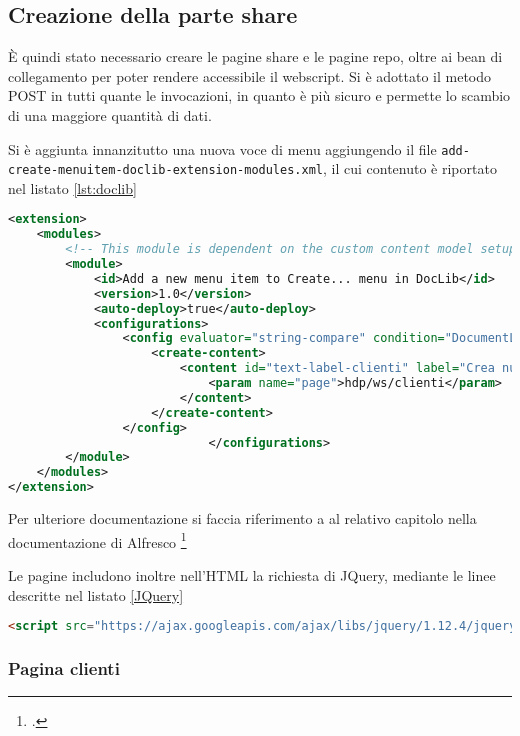 \subsection{Creazione della parte share}

È quindi stato necessario creare le pagine share e le pagine repo, oltre ai bean di collegamento per poter rendere accessibile il webscript. Si è adottato il metodo POST in tutti quante le invocazioni, in quanto è più sicuro e permette lo scambio di una maggiore quantità di dati.

Si è aggiunta innanzitutto una nuova voce di menu aggiungendo il file \texttt{add-create-menuitem-doclib-extension-modules.xml}, il cui contenuto è riportato nel listato \ref{lst:doclib}
\begin{lstlisting}[language=XML,caption=add-create-menuitem-doclib-extension-modules.xml, label=lst:doclib]
<extension>
    <modules>
        <!-- This module is dependent on the custom content model setup in the repo-amp module -->
        <module>
            <id>Add a new menu item to Create... menu in DocLib</id>
            <version>1.0</version>
            <auto-deploy>true</auto-deploy>
            <configurations>
                <config evaluator="string-compare" condition="DocumentLibrary">
                    <create-content>
                        <content id="text-label-clienti" label="Crea nuovo cliente" icon="text" type="pagelink">
                            <param name="page">hdp/ws/clienti</param>
                        </content>
                    </create-content>
                </config>
                            </configurations>
        </module>
    </modules>
</extension>
\end{lstlisting}

Per ulteriore documentazione si faccia riferimento a al relativo capitolo nella documentazione di Alfresco \footcite{site:alfresco-doclib}

Le pagine includono inoltre nell’HTML la richiesta di JQuery, mediante le linee descritte nel listato \ref{JQuery}
\begin{lstlisting}[language=HTML, caption=inclusione JQuery, label=JQuery]
<script src="https://ajax.googleapis.com/ajax/libs/jquery/1.12.4/jquery.min.js"></script>
\end{lstlisting}

\subsubsection{Pagina clienti}

